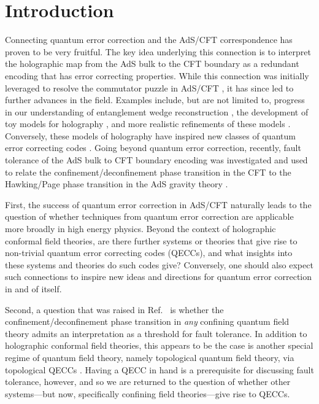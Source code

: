 \documentclass[11pt,english]{article}
\begin{document}
\setcounter{footnote}{0}


\newpage
\tableofcontents
\newpage


\section{Introduction}

Connecting quantum error correction and the AdS/CFT correspondence \cite{maldacena1999large, witten1998anti} has proven to be very fruitful.
The key idea underlying this connection is to interpret the holographic map from the AdS bulk to the CFT boundary as a redundant encoding that has error correcting properties.
While this connection was initially leveraged to resolve the commutator puzzle in AdS/CFT \cite{Almheiri_2015}, it has since led to further advances in the field.
Examples include, but are not limited to, progress in our understanding of entanglement wedge reconstruction \cite{cotler2019entanglement, dong2016reconstruction, faulkner2017bulk}, the development of toy models for holography \cite{Pastawski_2015}, and more realistic refinements of these models \cite{Bao_2019, Cao_2021, Hayden_2016}.
Conversely, these models of holography have inspired new classes of quantum error correcting codes \cite{holosteane,tnc,CL2021,LTNC,Milekhin,largeNcode}.
Going beyond quantum error correction, recently, fault tolerance of the AdS bulk to CFT boundary encoding was investigated and used to relate the confinement/deconfinement phase transition in the CFT to the Hawking/Page phase transition in the AdS gravity theory \cite{Bao_2022}.



First, the success of quantum error correction in AdS/CFT naturally leads to the question of whether techniques from quantum error correction are applicable more broadly in high energy physics.
Beyond the context of holographic conformal field theories, are there further systems or theories that give rise to non-trivial quantum error correcting codes (QECCs), and what insights into these systems and theories do such codes give?
Conversely, one should also expect such connections to inspire new ideas and directions for quantum error correction in and of itself.

Second, a question that was raised in Ref.~\cite{Bao_2022} is whether the confinement/deconfinement phase transition in \emph{any} confining quantum field theory admits an interpretation as a threshold for fault tolerance.
In addition to holographic conformal field theories, this appears to be the case is another special regime of quantum field theory, namely topological quantum field theory, via topological QECCs \cite{aharonov1999faulttolerant, Knill_1998,Kitaev_2003}.
Having a QECC in hand is a prerequisite for discussing fault tolerance, however, and so we are returned to the question of whether other systems---but now, specifically confining field theories---give rise to QECCs.
\end{document}
